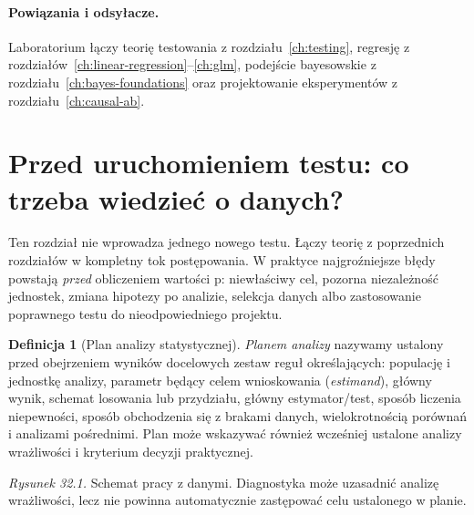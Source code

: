 \documentclass[11pt,a4paper,oneside]{report}
\numberwithin{equation}{chapter}
\theoremstyle{plain}
\theoremstyle{definition}
\newtheorem{definicja}{Definicja}[chapter]
\theoremstyle{remark}
\begin{document}
\paragraph{Powiązania i odsyłacze.} Laboratorium łączy teorię testowania z rozdziału~\ref{ch:testing}, regresję z rozdziałów~\ref{ch:linear-regression}--\ref{ch:glm}, podejście bayesowskie z rozdziału~\ref{ch:bayes-foundations} oraz projektowanie eksperymentów z rozdziału~\ref{ch:causal-ab}.


\section{Przed uruchomieniem testu: co trzeba wiedzieć o danych?}
Ten rozdział nie wprowadza jednego nowego testu. Łączy teorię z poprzednich rozdziałów w kompletny tok postępowania. W praktyce najgroźniejsze błędy powstają \emph{przed} obliczeniem wartości p: niewłaściwy cel, pozorna niezależność jednostek, zmiana hipotezy po analizie, selekcja danych albo zastosowanie poprawnego testu do nieodpowiedniego projektu.

\begin{definicja}[Plan analizy statystycznej]\label{def:stat-analysis-plan}
\emph{Planem analizy} nazywamy ustalony przed obejrzeniem wyników docelowych zestaw reguł określających: populację i jednostkę analizy, parametr będący celem wnioskowania (\emph{estimand}), główny wynik, schemat losowania lub przydziału, główny estymator/test, sposób liczenia niepewności, sposób obchodzenia się z brakami danych, wielokrotnością porównań i analizami pośrednimi. Plan może wskazywać również wcześniej ustalone analizy wrażliwości i kryterium decyzji praktycznej.
\end{definicja}

\begin{center}

{\small\emph{Rysunek 32.1.} Schemat pracy z danymi. Diagnostyka może uzasadnić analizę wrażliwości, lecz nie powinna automatycznie zastępować celu ustalonego w planie.}
\end{center}
\end{document}
